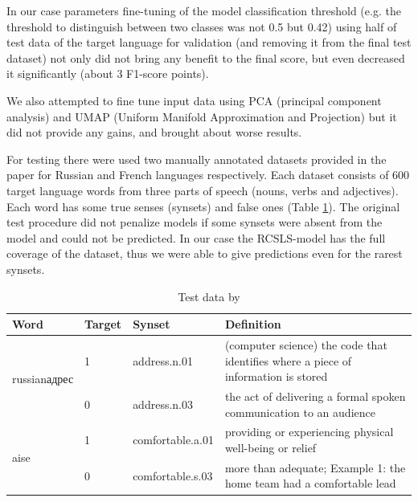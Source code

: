 \documentclass[11pt,a4paper]{article}
\begin{document}
In our case parameters fine-tuning of the model classification threshold (e.g. the threshold to distinguish between two classes was not 0.5 but 0.42) using half of test data of the target language for validation (and removing it from the final test dataset) not only did not bring any benefit to the final score, but even decreased it significantly (about 3 F1-score points).

We also attempted to fine tune input data using PCA (principal component analysis) and UMAP (Uniform Manifold Approximation and Projection) \cite{umap} but it did not provide any gains, and brought about worse results.

For testing there were used two manually annotated datasets provided in the paper \cite{Khodak2017} for Russian and French languages respectively. Each dataset consists of 600 target language words from three parts of speech (nouns, verbs and adjectives). Each word has some true senses (synsets) and false ones (Table \ref{wordnet-test-data}). The original test procedure did not penalize models if some synsets were absent from the model and could not be predicted. In our case the RCSLS-model has the full coverage of the dataset, thus we were able to give predictions even for the rarest synsets.

\begin{table}[!htbp]
	\small
	\caption{Test data by \cite{Khodak2017}}
	\label{wordnet-test-data}		
	\centering
	\begin{tabular}{l l l l}
		\hline
		Word & Target &  Synset & Definition \\ \hline
		\multirow{2}{*}{\begin{otherlanguage*}{russian}адрес \end{otherlanguage*}}
		& \multicolumn{1}{l}{1} & \multicolumn{1}{l}{address.n.01} & \multicolumn{1}{l}{(computer science) the code that identifies where a piece of information is stored} \\
		& \multicolumn{1}{l}{0} & \multicolumn{1}{l}{address.n.03} & \multicolumn{1}{l}{the act of delivering a formal spoken communication to an audience} \\
		\hline
		\multirow{2}{*}{aise}
		& \multicolumn{1}{l}{1} & \multicolumn{1}{l}{comfortable.a.01} & \multicolumn{1}{l}{providing or experiencing physical well-being or relief} \\
		& \multicolumn{1}{l}{0} & \multicolumn{1}{l}{comfortable.s.03} & \multicolumn{1}{l}{more than adequate; Example 1: the home team had a comfortable lead} \\
		\hline
	\end{tabular}
	
\end{table}
\end{document}
